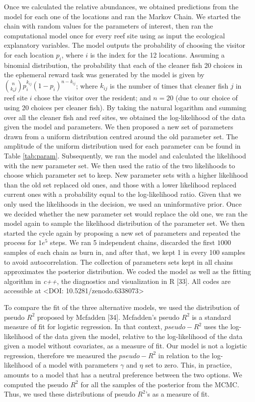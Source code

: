 \documentclass[10pt,letterpaper]{article}
\begin{document}
Once we calculated the relative abundances, we obtained predictions from
the model for each one of the locations and ran the Markov Chain. We
started the chain with random values for the parameters of interest,
then ran the computational model once for every reef site using as input
the ecological explanatory variables. The model outputs the probability
of choosing the visitor for each location \(p_i\), where \(i\) is the
index for the 12 locations. Assuming a binomial distribution, the
probability that each of the cleaner fish 20 choices in the ephemeral
reward task was generated by the model is given by
\(\binom{n}{k_ij}p^{k_{ij}}_i (1-p_i)^{n-k_{ij}}\); where \(k_{ij}\) is
the number of times that cleaner fish \(j\) in reef site \(i\) chose the
visitor over the resident; and \(n=20\) (due to our choice of using 20
choices per cleaner fish). By taking the natural logarithm and summing
over all the cleaner fish and reef sites, we obtained the log-likelihood
of the data given the model and parameters. We then proposed a new set
of parameters drawn from a uniform distribution centred around the old
parameter set. The amplitude of the uniform distribution used for each
parameter can be found in Table \ref{tab:param}. Subsequently, we ran
the model and calculated the likelihood with the new parameter set. We
then used the ratio of the two likelihoods to choose which parameter set
to keep. New parameter sets with a higher likelihood than the old set
replaced old ones, and those with a lower likelihood replaced current
ones with a probability equal to the log-likelihood ratio. Given that we
only used the likelihoods in the decision, we used an uninformative
prior. Once we decided whether the new parameter set would replace the
old one, we ran the model again to sample the likelihood distribution of
the parameter set. We then started the cycle again by proposing a new
set of parameters and repeated the process for \(1e^5\) steps. We ran 5
independent chains, discarded the first \(1000\) samples of each chain
as burn in, and after that, we kept 1 in every 100 samples to avoid
autocorrelation. The collection of parameters sets kept in all chains
approximates the posterior distribution. We coded the model as well as
the fitting algorithm in \emph{c++}, the diagnostics and visualization
in R {[}33{]}. All codes are accessible at \textless DOI:
10.5281/zenodo.6338073\textgreater{}

To compare the fit of the three alternative models, we used the
distribution of pseudo \(R^2\) proposed by Mcfadden {[}34{]}. Mcfadden's
pseudo \(R^2\) is a standard measure of fit for logistic regression. In
that context, \(pseudo-R^2\) uses the log-likelihood of the data given
the model, relative to the log-likelihood of the data given a model
without covariates, as a measure of fit. Our model is not a logistic
regression, therefore we measured the \(pseudo-R^2\) in relation to the
log-likelihood of a model with parameters \(\gamma\) and \(\eta\) set to
zero. This, in practice, amounts to a model that has a neutral
preference between the two options. We computed the pseudo \(R^2\) for
all the samples of the posterior from the MCMC. Thus, we used these
distributions of pseudo \(R^2\)'s as a measure of fit.
\end{document}
